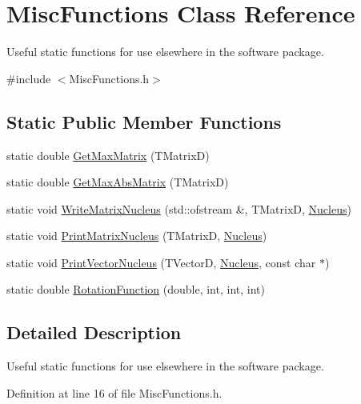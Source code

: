 \hypertarget{classMiscFunctions}{\section{Misc\-Functions Class Reference}
\label{classMiscFunctions}
}


Useful static functions for use elsewhere in the software package.  




{\ttfamily \#include $<$Misc\-Functions.\-h$>$}

\subsection*{Static Public Member Functions}
\begin{DoxyCompactItemize}
\item 
static double \hyperlink{classMiscFunctions_a94aa5dcad8b420d3b3e09554d42d8fc8}{Get\-Max\-Matrix} (T\-Matrix\-D)
\item 
static double \hyperlink{classMiscFunctions_a013c73579d32d966d225b96304d39dda}{Get\-Max\-Abs\-Matrix} (T\-Matrix\-D)
\item 
static void \hyperlink{classMiscFunctions_a53cef6044e7ce41d37789c2c76948226}{Write\-Matrix\-Nucleus} (std\-::ofstream \&, T\-Matrix\-D, \hyperlink{classNucleus}{Nucleus})
\item 
static void \hyperlink{classMiscFunctions_af49d629dced5a9125091a92bed3a4a0e}{Print\-Matrix\-Nucleus} (T\-Matrix\-D, \hyperlink{classNucleus}{Nucleus})
\item 
static void \hyperlink{classMiscFunctions_a6c137b98015696ba93abab4f31bcbb6b}{Print\-Vector\-Nucleus} (T\-Vector\-D, \hyperlink{classNucleus}{Nucleus}, const char $\ast$)
\item 
static double \hyperlink{classMiscFunctions_a91d1bb1bc78782da9523392de913efe9}{Rotation\-Function} (double, int, int, int)
\end{DoxyCompactItemize}


\subsection{Detailed Description}
Useful static functions for use elsewhere in the software package. 

Definition at line 16 of file Misc\-Functions.\-h.



